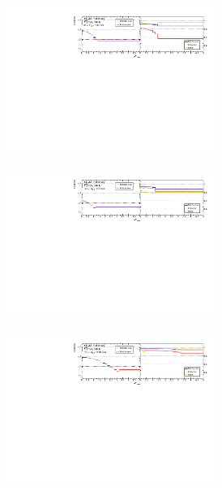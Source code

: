 \begin{figure}[htb]
    \centering 
    \begin{subfigure}{.99\textwidth}\centering
        \includegraphics[width = 0.75\textwidth]{Figures/m4l/UnfoldingStudies/v014_inputs/deltaYPairs_m4l60-100inputs.pdf}
    \end{subfigure}
    \begin{subfigure}{.99\textwidth}\centering
        \includegraphics[width = 0.75\textwidth]{Figures/m4l/UnfoldingStudies/v014_inputs/deltaYPairs_m4l120-130inputs.pdf}
    \end{subfigure}
    \begin{subfigure}{.99\textwidth}\centering
        \includegraphics[width = 0.75\textwidth]{Figures/m4l/UnfoldingStudies/v014_inputs/deltaYPairs_m4l180-2000inputs.pdf}

\end{subfigure}
\end{figure}
